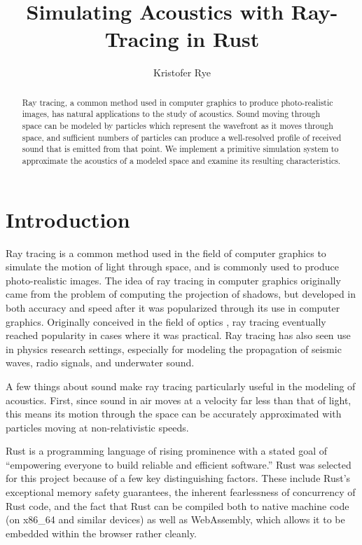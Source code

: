 \documentclass[10pt]{article}
\title{Simulating Acoustics with Ray-Tracing in Rust}
\author{Kristofer Rye}
\begin{document}
\maketitle

\begin{abstract}
  \noindent Ray tracing, a common method used in computer graphics to produce
  photo-realistic images, has natural applications to the study of acoustics.
  Sound moving through space can be modeled by particles which represent the
  wavefront as it moves through space, and sufficient numbers of particles can
  produce a well-resolved profile of received sound that is emitted from that
  point.  We implement a primitive simulation system to approximate the
  acoustics of a modeled space and examine its resulting characteristics.
\end{abstract}

\section{Introduction}

Ray tracing is a common method used in the field of computer graphics to
simulate the motion of light through space, and is commonly used to produce
photo-realistic images.  The idea of ray tracing in computer graphics originally
came from the problem of computing the projection of shadows, \cite{Appel1968}
but developed in both accuracy and speed after it was popularized through its
use in computer graphics.  Originally conceived in the field of optics
\cite{Spencer62}, ray tracing eventually reached popularity in cases where it
was practical.  Ray tracing has also seen use in physics research settings,
especially for modeling the propagation of seismic waves, radio signals, and
underwater sound.

A few things about sound make ray tracing particularly useful in the modeling of
acoustics.  First, since sound in air moves at a velocity far less than that of
light, this means its motion through the space can be accurately approximated
with particles moving at non-relativistic speeds.

Rust is a programming language of rising prominence with a stated goal of
``empowering everyone to build reliable and efficient software.'' \cite{Rust}
Rust was selected for this project because of a few key distinguishing factors.
These include Rust's exceptional memory safety guarantees, the inherent
fearlessness of concurrency of Rust code, and the fact that Rust can be compiled
both to native machine code (on x86\_64 and similar devices) as well as
WebAssembly, which allows it to be embedded within the browser rather cleanly.
\end{document}
